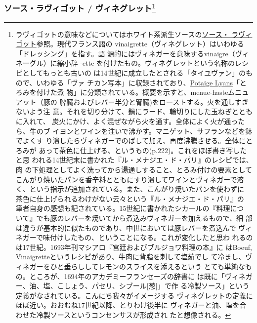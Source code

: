 \begin{recette}
{\subsubsection[ソース・ラヴィゴット /
ヴィネグレット]{\texorpdfstring{ソース・ラヴィゴット /
ヴィネグレット\footnote{ラヴィゴットの意味などについてはホワイト系派生ソースの\protect\hyperlink{sauce-ravigote}{ソース・
  ラヴィゴット}参照。現代フランス語の
  vinaigrette（ヴィネグレット）はいわゆる「ドレッシング」を指す。語
  源的にはヴィネガーを意味するvinaigre（ヴィネーグル）に縮小辞 -ette
  を付けたもの。ヴィネグレットという名称のレシピとしてもっとも古いの
  は14世紀に成立したとされる「タイユヴァン」のもので、いわゆる「ヴァ
  チカン写本」に収録されており、\ul{Potaige Lyans}「とろみを付けた煮
  物」に分類されている。概要を示すと、menue-hasteムニュアット（豚の
  脾臓およびレバー半分と腎臓)をローストする。火を通しすぎないよう注
  意。それを切り分けて、鍋にラード、輪切りにした玉ねぎとともに入れて、
  炭火にかけ、よく混ぜながら火を通す。全体によく火が通ったら、牛のブ
  イヨンとワインを注いで沸かす。マニゲット、サフランなどを鉢でよくす
  り潰したらヴィネガーでのばして加え、再度沸騰させる。全体にとろみが
  あって茶色に仕上げる、というもの(p.222)。これをほぼ書き写したと思
  われる14世紀末に書かれた『ル・メナジエ・ド・パリ』のレシピでは、肉
  の下処理としてよく洗ってから湯通しすること、とろみ付けの要素として
  こんがり焼いたパンを香辛料とともにすり潰してワインとヴィネガーで溶
  く、という指示が追加されている。また、こんがり焼いたパンを使わずに
  茶色に仕上げられるわけがない云々という『ル・メナジエ・ド・パリ』の
  筆者自身の感想も記されている。15世紀に書かれたシカールの『料理につ
  いて』でも豚のレバーを焼いてから煮込みヴィネガーを加えるもので、細
  部は違うが基本的に似たものであり、中世においては豚レバーを煮込んで
  ヴィネガーで味付けしたもの、ということになる。これが変化したと思わ
  れるのは17世紀。1693年刊マシアロ『宮廷およびブルジョワ料理の本』に
  はBoeuf, Vinaigretteというレシピがあり、牛肉に背脂を刺して塩茹でし
  て冷まし、ヴィネガーをひと垂らししてレモンのスライスを添えるという
  とても単純なもの。ところが、1694年のアカデミーフランセーズの辞書に
  は既に「ヴィネガー、油、塩、こしょう、パセリ、シブール{[}葱{]}」で作
  る冷製ソース」という定義がなされている。こんにち我々がイメージする
  ヴィネグレットの定義にほぼ近い。おおむね17世紀以降、とりわけ後半に
  ヴィネガーと油、塩を合わせた冷製ソースというコンセンサスが形成され
  たと想像される。}}{ソース・ラヴィゴット / ヴィネグレット}}\label{sauce-ravigote-froide}}



\end{recette}
